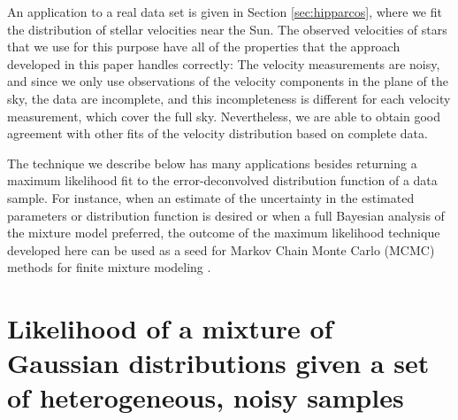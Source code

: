 \documentclass[aoas,preprint,authoryear,round]{imsart}
\newcommand{\eg}{e.g.}
\begin{document}
An application to a real data set is given in Section
\ref{sec:hipparcos}, where we fit the distribution of stellar
velocities near the Sun. The observed velocities of stars that we use
for this purpose have all of the properties that the approach
developed in this paper handles correctly: The velocity measurements
are noisy, and since we only use observations of the velocity
components in the plane of the sky, the data are incomplete, and this
incompleteness is different for each velocity measurement, which cover
the full sky. Nevertheless, we are able to obtain good agreement with
other fits of the velocity distribution based on complete data.


The technique we describe below has many applications besides
returning a maximum likelihood fit to the error-deconvolved
distribution function of a data sample. For instance, when an estimate
of the uncertainty in the estimated parameters or distribution
function is desired or when a full Bayesian analysis of the mixture
model preferred, the outcome of the maximum likelihood technique
developed here can be used as a seed for Markov Chain Monte Carlo
(MCMC) methods for finite mixture modeling
\citep[\eg,][]{diebolt94a,Richardson97a}.


\section{Likelihood of a mixture of Gaussian distributions given a set of heterogeneous, noisy samples}\label{sec:objective}
\end{document}
